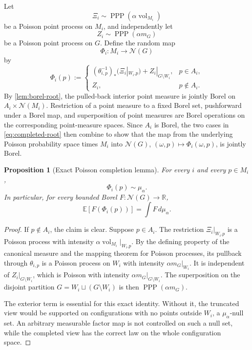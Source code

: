 \documentclass[12pt]{amsart}
\newtheorem{proposition}[proposition]{Proposition}
\theoremstyle{definition}
\newcommand{\Haar}{m_G}
\newcommand{\vol}{\operatorname{vol}}
\newcommand{\PPP}{\operatorname{PPP}}
\newcommand{\cN}{\mathcal N}
\newcommand{\1}{\mathbf 1}
\newcommand{\dd}{\,d}
\begin{document}
Let
\[
 \Xi_i\sim\PPP(\alpha\vol_{M_i})
\]
be a Poisson point process on $M_i$, and independently let
\[
 Z_i\sim\PPP(\alpha\Haar)
\]
be a Poisson point process on $G$. Define the random map
\[
 \Phi_i:M_i\longrightarrow\cN(G)
\]
by
\begin{equation}\label{eq:completed-root}
 \Phi_i(p):=
 \begin{cases}
 (\theta_{i,p}^{-1})_*(\Xi_i|_{W_i.p})+Z_i|_{G\setminus W_i},&p\in A_i,\\[2mm]
 Z_i,&p\notin A_i.
 \end{cases}
\end{equation}
By \cref{lem:borel-root}, the pulled-back interior point measure is jointly Borel on $A_i\times\cN(M_i)$. Restriction of a point measure to a fixed Borel set, pushforward under a Borel map, and superposition of point measures are Borel operations on the corresponding point-measure spaces. Since $A_i$ is Borel, the two cases in \eqref{eq:completed-root} then combine to show that the map from the underlying Poisson probability space times $M_i$ into $\cN(G)$, $(\omega,p)\mapsto\Phi_i(\omega,p)$, is jointly Borel.

\begin{proposition}[Exact Poisson completion lemma]\label{prop:exact-marginal}
For every $i$ and every $p\in M_i$,
\[
 \Phi_i(p)\sim\mu_\alpha.
\]
In particular, for every bounded Borel $F:\cN(G)\to\mathbb R$,
\begin{equation}\label{eq:exact-expectation}
 \mathbb E[F(\Phi_i(p))]=\int F\dd\mu_\alpha.
\end{equation}
\end{proposition}

\begin{proof}
If $p\notin A_i$, the claim is clear. Suppose $p\in A_i$. The restriction $\Xi_i|_{W_i.p}$ is a Poisson process with intensity $\alpha\vol_{M_i}|_{W_i.p}$. By the defining property of the canonical measure and the mapping theorem for Poisson processes, its pullback through $\theta_{i,p}$ is a Poisson process on $W_i$ with intensity $\alpha\Haar|_{W_i}$. It is independent of $Z_i|_{G\setminus W_i}$, which is Poisson with intensity $\alpha\Haar|_{G\setminus W_i}$. The superposition on the disjoint partition $G=W_i\sqcup(G\setminus W_i)$ is then $\PPP(\alpha\Haar)$.

The exterior term is essential for this exact identity. Without it, the
truncated view would be supported on configurations with no points outside
$W_i$, a $\mu_\alpha$-null set. An arbitrary measurable factor map is not
controlled on such a null set, while the completed view has the correct law
on the whole configuration space.
\end{proof}
\end{document}

